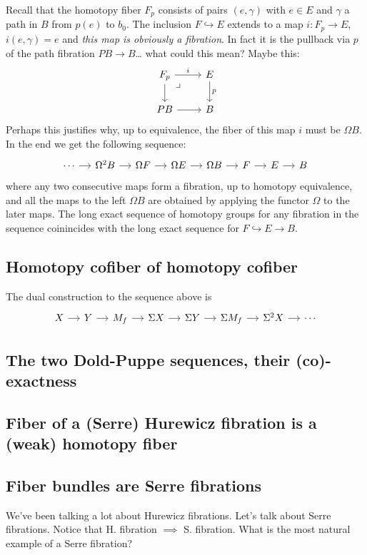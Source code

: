 Recall that the homotopy fiber $F_p$ consists of pairs $(e,\gamma)$ with $e\in E$ and $\gamma$ a path in $B$ from $p(e)$ to $b_0$. The inclusion $F\hookrightarrow E$ extends to a map $i:F_{p}\to E$, $i(e,\gamma)=e$ and \textit{this map is obviously a fibration}. In fact it is the pullback via $p$ of the path fibration $PB\to B$… {\color{blue}what could this mean? Maybe this:}
\[\begin{tikzcd}
	F_{p}\arrow[r,"i"]\arrow[d]\arrow[dr,phantom,very near start,"\lrcorner"]&E\arrow[d,"p"]\\
	PB\arrow[r]&B
\end{tikzcd}\]
Perhaps this justifies why, up to equivalence, the fiber of this map $i$ must be $\Omega B$. In the end we get the following sequence:
\[\begin{tikzcd}[column sep=small]
	\cdots\arrow[r]&\Omega^{2}B\arrow[r]&\Omega F\arrow[r]&\Omega E\arrow[r]&\Omega B\arrow[r]&F\arrow[r]&E\arrow[r]&B
\end{tikzcd}\]
where any two consecutive maps form a fibration, up to homotopy equivalence, and all the maps to the left $\Omega B$ are obtained by applying the functor $\Omega$ to the later maps. The long exact sequence of homotopy groups for any fibration in the sequence coinincides with the long exact sequence for $F\hookrightarrow E\to B$.

\subsection*{Homotopy cofiber of homotopy cofiber}

The dual construction to the sequence above is
\[\begin{tikzcd}[column sep=small]
	X\arrow[r]&Y\arrow[r]&M_{f}\arrow[r]&\Sigma X\arrow[r]&\Sigma Y\arrow[r]&\Sigma M_{f}\arrow[r]&\Sigma^{2}X\arrow[r]&\cdots 
\end{tikzcd}\]

\subsection*{The two Dold-Puppe sequences, their (co)-exactness}

\subsection*{Fiber of a (Serre) Hurewicz fibration is a (weak) homotopy fiber}

\subsection*{Fiber bundles are Serre fibrations}
We've been talking a lot about Hurewicz fibrations. Let's talk about Serre fibrations. Notice that H. fibration $\implies$ S. fibration. What is the most natural example of a Serre fibration?

